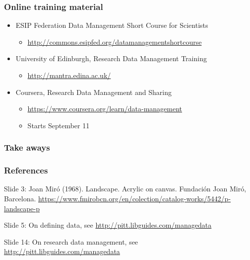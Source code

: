 \documentclass{beamer}
\begin{document}
\begin{frame}
  \frametitle{Online training material}
  
  \begin{itemize}
  \item ESIP Federation Data Management Short Course for Scientists 
  \begin{itemize}
  \item \url{http://commons.esipfed.org/datamanagementshortcourse}
  \end{itemize}
  \item University of Edinburgh, Research Data Management Training
  \begin{itemize}
  \item \url{http://mantra.edina.ac.uk/}
  \end{itemize}
  \item Coursera, Research Data Management and Sharing
  \begin{itemize}
  \item \url{https://www.coursera.org/learn/data-management}
  \item Starts September 11
  \end{itemize}
  \end{itemize}
\end{frame}

\begin{frame}
  \frametitle{Take aways}
  
\end{frame}

\begin{frame}
  \frametitle{References}
  \tiny
  
  \vspace{0.5cm}
  Slide 3: Joan Mir{\'o} (1968). Landscape. Acrylic on canvas. Fundaci{\'o}n Joan Mir{\'o}, Barcelona. \url{https://www.fmirobcn.org/en/colection/catalog-works/5442/p-landscape-p}
  
  Slide 5: On defining data, see \url{http://pitt.libguides.com/managedata}
  
  Slide 14: On research data management, see \url{http://pitt.libguides.com/managedata}
\end{frame}
\end{document}
